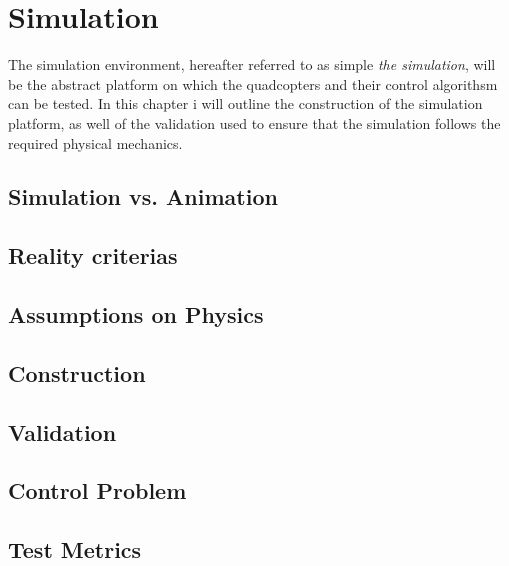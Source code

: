 
\chapter{Simulation}
\label{chap:simulation}
The simulation environment, hereafter referred to as simple \textit{the simulation}, will be the abstract platform on which the quadcopters and their control algorithsm can be tested. 
In this chapter i will outline the construction of the simulation platform, as well of the validation used to ensure that the simulation follows the required physical mechanics. 

\section{Simulation vs. Animation}
\label{sec:simulation_animation}

\section{Reality criterias}
\label{sec:reality}

\section{Assumptions on Physics}
\label{sec:physics}


\section{Construction}
\label{sec:construction}



\section{Validation}
\label{sec:validation}

\section{Control Problem}
\label{sec:control_problem}

\section{Test Metrics}
\label{sec:test_metrics}

